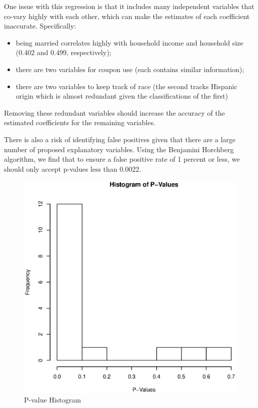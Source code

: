 \documentclass[11pt, fleqn]{article}
\begin{document}
One issue with this regression is that it includes many independent variables that co-vary highly with each other, which can make the estimates of each coefficient inaccurate. Specifically:
\begin{itemize}
  \item being married correlates highly with household income and household size (0.402 and 0.499, respectively);
  \item there are two variables for coupon use (each contains similar information);
  \item there are two variables to keep track of race (the second tracks Hispanic origin which is almost redundant given the classifications of the first)
\end{itemize}
Removing these redundant variables should increase the accuracy of the estimated coefficients for the remaining variables. 

There is also a risk of identifying false positives given that there are a large number of proposed explanatory variables. Using the Benjamini Horchberg algorithm, we find that to ensure a false positive rate of 1 percent or less, we should only accept p-values less than 0.0022.

\begin{figure}[!htb]
\centering
\includegraphics[scale=.5]{pvalue_hist.eps}
\caption{P-value Histogram}
\label{fig:pvalue}
\end{figure}
\end{document}
